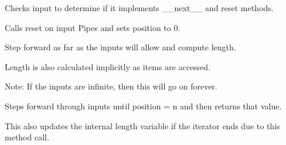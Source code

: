 \documentclass[letterpaper,10pt,english]{sphinxmanual}
\begin{document}
\begin{fulllineitems}
\begin{fulllineitems}
\label{\detokenize{Fireworks:Fireworks.toolbox.pipes.LoopingPipe.name}}
\end{fulllineitems}


\begin{fulllineitems}
\label{\detokenize{Fireworks:Fireworks.toolbox.pipes.LoopingPipe.check_input}}
Checks input to determine if it implements \_\_next\_\_ and reset methods.

\end{fulllineitems}


\begin{fulllineitems}
\label{\detokenize{Fireworks:Fireworks.toolbox.pipes.LoopingPipe.reset}}
Calls reset on input Pipes and sets position to 0.

\end{fulllineitems}


\begin{fulllineitems}
\label{\detokenize{Fireworks:Fireworks.toolbox.pipes.LoopingPipe.compute_length}}
Step forward as far as the inputs will allow and compute length.

Length is also calculated implicitly as items are accessed.

Note: If the inputs are infinite, then this will go on forever.

\end{fulllineitems}


\begin{fulllineitems}
\label{\detokenize{Fireworks:Fireworks.toolbox.pipes.LoopingPipe.step_forward}}
Steps forward through inputs until position = n and then returns that value.

This also updates the internal length variable if the iterator ends due to this method call.

\end{fulllineitems}


\end{fulllineitems}
\end{document}
